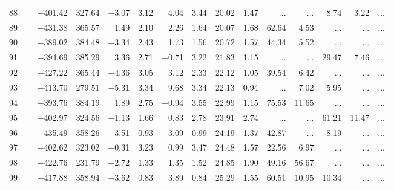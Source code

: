 \begin{table*}[p]
{\begin{tabular}{l@{ }r@{ \ }rr@{ \ }rr@{ \ }rrrr@{ \ }r@{ \ }r@{ \ }r@{ \ }r}
 88   \ \dotfill \  &  $-$401.42 &    327.64 &  $-$3.07 &   3.12 &    4.04 &   3.44&   20.02 &   1.47&    ...     &    ...     &        8.74 &        3.22 &    ...       \\     
 89   \ \dotfill \  &  $-$431.38 &    365.57 &    1.49 &   2.10 &    2.26 &   1.64&   20.07 &   1.68&       62.64 &        4.53 &    ...     &    ...     &    ...       \\     
 90   \ \dotfill \  &  $-$389.02 &    384.48 &  $-$3.34 &   2.43 &    1.73 &   1.56&   20.72 &   1.57&       44.34 &        5.52 &    ...     &    ...     &    ...       \\     
 91   \ \dotfill \  &  $-$394.69 &    385.29 &    3.36 &   2.71 &  $-$0.71 &   3.22&   21.83 &   1.15 &    ...     &    ...     &       29.47 &        7.46 &    ...       \\     
 92   \ \dotfill \  &  $-$427.22 &    365.44 &  $-$4.36 &   3.05 &    3.12 &   2.33&   22.12 &   1.05 &       39.54 &        6.42 &    ...     &    ...     &    ...       \\     
 93   \ \dotfill \  &  $-$413.70 &    279.51 &  $-$5.31 &   3.34 &    9.68 &   3.34&   22.13 &   0.94 &    ...     &        7.02 &        5.95 &    ...     &    ...       \\     
 94   \ \dotfill \  &  $-$393.76 &    384.19 &    1.89 &   2.75 &  $-$0.94 &   3.55&   22.99 &   1.15&       75.53 &       11.65 &    ...     &    ...     &    ...       \\     
 95   \ \dotfill \  &  $-$402.97 &    324.56 &  $-$1.13 &   1.66 &    0.83 &   2.78&   23.91 &   2.74&    ...     &    ...     &       61.21 &       11.47 &    ...       \\     
 96   \ \dotfill \  &  $-$435.49 &    358.26 &  $-$3.51 &   0.93 &    3.09 &   0.99&   24.19 &   1.37&       42.87 &    ...     &        8.19 &    ...     &    ...       \\     
 97   \ \dotfill \  &  $-$402.62 &    323.02 &  $-$0.31 &   3.23 &    0.99 &   3.47&   24.48 &   1.57&       22.56 &        6.97 &    ...     &    ...     &    ...       \\     
 98   \ \dotfill \  &  $-$422.76 &    231.79 &  $-$2.72 &   1.33 &    1.35 &   1.52&   24.85 &   1.90&       49.16 &       56.67 &    ...     &    ...     &    ...       \\     
 99   \ \dotfill \  &  $-$417.88 &    358.94 &  $-$3.62 &   0.83 &    3.89 &   0.84&   25.29 &   1.55&       60.51 &       10.95 &       10.34 &    ...     &    ...       \\     

\end{tabular}}
\end{table*}
